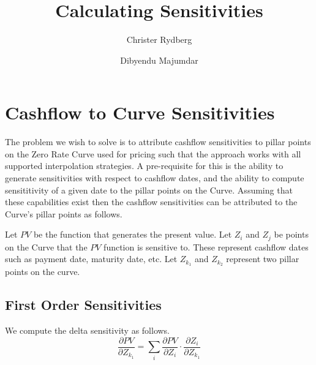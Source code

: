 \documentclass[11pt, oneside]{article}
\title{Calculating Sensitivities}
\author{Christer Rydberg \and Dibyendu Majumdar}
\begin{document}
\maketitle

\section{Cashflow to Curve Sensitivities}
The problem we wish to solve is to attribute cashflow sensitivities to pillar points on the Zero Rate Curve used for pricing such that the approach works with all supported interpolation strategies. A pre-requisite for this is the ability to generate sensitivities with respect to cashflow dates, and the ability to compute sensititivity of a given date to the pillar points on the Curve. Assuming that these capabilities exist then the cashflow sensitivities can be attributed to the Curve's pillar points as follows.

Let $PV$ be the function that generates the present value.
Let $Z_i$ and $Z_j$ be points on the Curve that the $PV$ function is sensitive to. These represent cashflow dates such as payment date, maturity date, etc. 
Let $Z_{k_1}$ and $Z_{k_2}$ represent two pillar points on the curve.

\subsection{First Order Sensitivities}
We compute the delta sensitivity as follows.
\begin{equation}
\frac{\partial PV}{\partial Z_{k_1}} = \sum_{i} \frac{\partial PV}{\partial Z_i} \cdot \frac{\partial Z_i}{\partial Z_{k_1}}
\end{equation}
\end{document}
